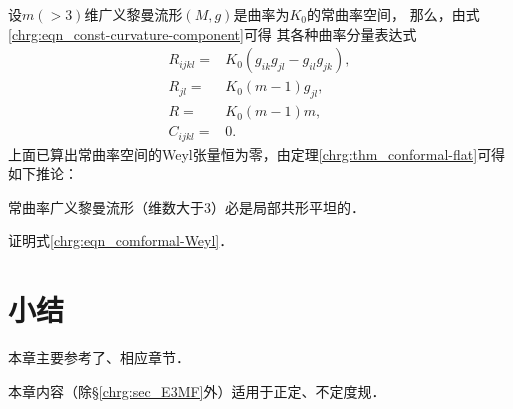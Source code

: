 设$m(>3)$维广义黎曼流形$(M,g)$是曲率为$K_0$的常曲率空间，
那么，由式\eqref{chrg:eqn_const-curvature-component}可得
其各种曲率分量表达式
\begin{align}
    R_{ijkl}=&  K_0 ( g_{ik}g_{jl}- g_{il}g_{jk}  ), \\
    R_{jl}=&  K_0 ( m - 1  ) g_{jl}, \\
    R=& K_0 ( m - 1  ) m , \\
    C_{ijkl}=& 0 .
\end{align}
上面已算出常曲率空间的Weyl张量恒为零，由定理\ref{chrg:thm_conformal-flat}可得如下推论：
\begin{corollary}\label{chrg:thm_conformal-flat-const-curvature}
    常曲率广义黎曼流形（维数大于3）必是局部共形平坦的．
\end{corollary}




\begin{exercise}
	证明式\eqref{chrg:eqn_comformal-Weyl}．
\end{exercise}


\section*{小结}
本章主要参考了\parencite{cc2001-zh}、\parencite{chen-li-2023-2ed-v1}相应章节．

本章内容（除\S\ref{chrg:sec_E3MF}外）适用于正定、不定度规．


\printbibliography[heading=subbibliography,title=第\ref{chrg}章参考文献]

\endinput
